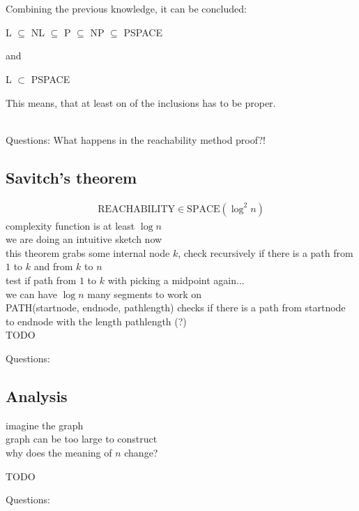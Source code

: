 \documentclass[a4]{scrartcl}
\begin{document}
\ \\ \\
Combining the previous knowledge, it can be concluded:
\begin{center}
L $\subseteq$ NL $\subseteq$ P $\subseteq$ NP $\subseteq$ PSPACE
\end{center}
and
\begin{center}
L $\subset$ PSPACE
\end{center}
This means, that at least on of the inclusions has to be proper.

\ \\
\color{violet} Questions: What happens in the reachability method proof?!
\color{black}





\subsection*{Savitch's theorem}
\begin{align*}
\text{REACHABILITY} \in \text{SPACE}(\log^2 n)
\end{align*}
complexity function is at least $\log n$ \\
we are doing an intuitive sketch now \\
this theorem grabs some internal node $k$, check recursively if there is a path from $1$ to $k$ and from $k$ to $n$ \\
test if path from $1$ to $k$ with picking a midpoint again... \\
we can have $\log n$ many segments to work on \\
PATH(startnode, endnode, pathlength) checks if there is a path from startnode to endnode with the length pathlength (?) \\



\color{red} TODO
\color{black}

\color{violet} Questions:
\color{black}



\subsection*{Analysis}
imagine the graph \\
graph can be too large to construct \\
why does the meaning of $n$ change?



\color{red} TODO
\color{black}

\color{violet} Questions:
\color{black}















\newpage

\printbibliography
\end{document}
